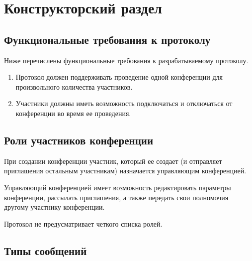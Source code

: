 \chapter{Конструкторский раздел}

\section{Функциональные требования к протоколу}

Ниже перечислены функциональные требования к разрабатываемому протоколу.

\begin{enumerate}
    \item Протокол должен поддерживать проведение одной конференции для произвольного количества участников.
    \item Участники должны иметь возможность подключаться и отключаться от конференции во время ее проведения.
\end{enumerate}

\section{Роли участников конференции}

При создании конференции участник, который ее создает (и отправляет приглашения остальным участникам) назначается управляющим конференцией.

Управляющий конференцией имеет возможность редактировать параметры конференции, рассылать приглашения, а также передать свои полномочия другому участнику конференции.

Протокол не предусматривает четкого списка ролей.

\section{Типы сообщений}

